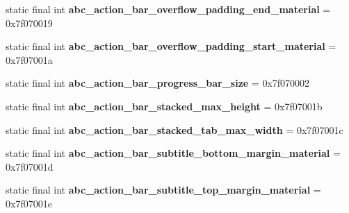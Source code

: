 \begin{DoxyCompactItemize}
\item 
\hypertarget{classandroid_1_1support_1_1design_1_1_r_1_1dimen_a953114168a0144f2305101244e1eb4bd}{}static final int {\bfseries abc\+\_\+action\+\_\+bar\+\_\+overflow\+\_\+padding\+\_\+end\+\_\+material} = 0x7f070019\label{classandroid_1_1support_1_1design_1_1_r_1_1dimen_a953114168a0144f2305101244e1eb4bd}

\item 
\hypertarget{classandroid_1_1support_1_1design_1_1_r_1_1dimen_afcc656fd9ff7526cf3a9713155929f19}{}static final int {\bfseries abc\+\_\+action\+\_\+bar\+\_\+overflow\+\_\+padding\+\_\+start\+\_\+material} = 0x7f07001a\label{classandroid_1_1support_1_1design_1_1_r_1_1dimen_afcc656fd9ff7526cf3a9713155929f19}

\item 
\hypertarget{classandroid_1_1support_1_1design_1_1_r_1_1dimen_a0841a2247b3ff85cbcaeda6ea97c0944}{}static final int {\bfseries abc\+\_\+action\+\_\+bar\+\_\+progress\+\_\+bar\+\_\+size} = 0x7f070002\label{classandroid_1_1support_1_1design_1_1_r_1_1dimen_a0841a2247b3ff85cbcaeda6ea97c0944}

\item 
\hypertarget{classandroid_1_1support_1_1design_1_1_r_1_1dimen_ab0160db7b64c23fb4ca25a6506556408}{}static final int {\bfseries abc\+\_\+action\+\_\+bar\+\_\+stacked\+\_\+max\+\_\+height} = 0x7f07001b\label{classandroid_1_1support_1_1design_1_1_r_1_1dimen_ab0160db7b64c23fb4ca25a6506556408}

\item 
\hypertarget{classandroid_1_1support_1_1design_1_1_r_1_1dimen_a8dc041a733fe2e1bb35f5791f118b1e8}{}static final int {\bfseries abc\+\_\+action\+\_\+bar\+\_\+stacked\+\_\+tab\+\_\+max\+\_\+width} = 0x7f07001c\label{classandroid_1_1support_1_1design_1_1_r_1_1dimen_a8dc041a733fe2e1bb35f5791f118b1e8}

\item 
\hypertarget{classandroid_1_1support_1_1design_1_1_r_1_1dimen_aec33706c986e5fc925371f6eb778339c}{}static final int {\bfseries abc\+\_\+action\+\_\+bar\+\_\+subtitle\+\_\+bottom\+\_\+margin\+\_\+material} = 0x7f07001d\label{classandroid_1_1support_1_1design_1_1_r_1_1dimen_aec33706c986e5fc925371f6eb778339c}

\item 
\hypertarget{classandroid_1_1support_1_1design_1_1_r_1_1dimen_ab044319f6a390e09597b7a26ca4239fa}{}static final int {\bfseries abc\+\_\+action\+\_\+bar\+\_\+subtitle\+\_\+top\+\_\+margin\+\_\+material} = 0x7f07001e\label{classandroid_1_1support_1_1design_1_1_r_1_1dimen_ab044319f6a390e09597b7a26ca4239fa}


\end{DoxyCompactItemize}
